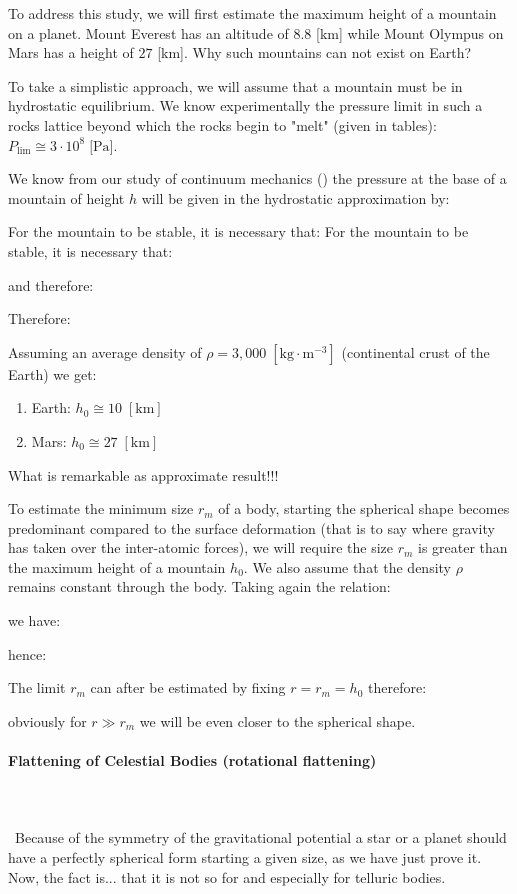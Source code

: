 	To address this study, we will first estimate the maximum height of a mountain on a planet. Mount Everest has an altitude of $8.8$ [km] while Mount Olympus on Mars has a height of $27$ [km]. Why such mountains can not exist on Earth?

	To take a simplistic approach, we will assume that a mountain must be in hydrostatic equilibrium. We know experimentally the pressure limit in such a rocks lattice beyond which the rocks begin to "melt" (given in tables): $P_{\text{lim}}\cong 3 \cdot 10^8\;\text{[Pa]}$.

	We know from our study of continuum mechanics () the pressure at the base of a mountain of height $h$ will be given in the hydrostatic approximation by:
	
	For the mountain to be stable, it is necessary that:
	For the mountain to be stable, it is necessary that:
	
	and therefore:
	
	Therefore:
	
	Assuming an average density of $\rho=3,000\;[\text{kg}\cdot \text{m}^{-3}]$ (continental crust of the Earth) we get:
	\begin{enumerate}
		\item Earth: $h_0\cong 10\; [\text{km}]$
		\item Mars: $h_0\cong 27\; [\text{km}]$
	\end{enumerate}
	What is remarkable as approximate result!!!

	To estimate the minimum size $r_m$ of a body, starting the spherical shape becomes predominant compared to the surface deformation (that is to say where gravity has taken over the inter-atomic forces), we will require the size $r_m$ is greater than the maximum height of a mountain $h_0$. We also assume that the density $\rho$ remains constant through the body. Taking again the relation:
	
	we have:
	
	hence:
	
	The limit $r_m$ can after be estimated by fixing $r=r_m=h_0$ therefore:
	
	obviously for $r\gg r_m$ we will be even closer to the spherical shape.

	\paragraph{Flattening of Celestial Bodies (rotational flattening)}\mbox{}\\\\\
	Because of the symmetry of the gravitational potential a star or a planet should have a perfectly spherical form starting a given size, as we have just prove it. Now, the fact is... that it is not so for and especially for telluric bodies.
	
